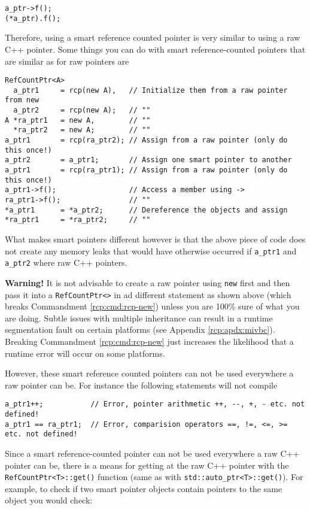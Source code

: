 {\scriptsize\begin{verbatim}
a_ptr->f();
(*a_ptr).f();
\end{verbatim}}

Therefore, using a smart reference counted pointer is very similar to
using a raw C++ pointer.  Some things you can do with smart
reference-counted pointers that are similar as for raw pointers are

{\scriptsize\begin{verbatim}
RefCountPtr<A>
  a_ptr1     = rcp(new A),   // Initialize them from a raw pointer from new
  a_ptr2     = rcp(new A);   // ""
A *ra_ptr1   = new A,        // ""
  *ra_ptr2   = new A;        // ""
a_ptr1       = rcp(ra_ptr2); // Assign from a raw pointer (only do this once!)
a_ptr2       = a_ptr1;       // Assign one smart pointer to another
a_ptr1       = rcp(ra_ptr1); // Assign from a raw pointer (only do this once!)
a_ptr1->f();                 // Access a member using ->
ra_ptr1->f();                // ""
*a_ptr1      = *a_ptr2;      // Dereference the objects and assign
*ra_ptr1     = *ra_ptr2;     // "" 
\end{verbatim}}

What makes smart pointers different however is that the above piece of code
does not create any memory leaks that would have otherwise occurred
if \texttt{a\_ptr1} and \texttt{a\_ptr2} where raw C++ pointers.

\textbf{Warning!} It is not advisable to create a raw pointer using
\texttt{new} first and then pass it into a \texttt{RefCountPtr<>} in
ad different statement as shown above (which breaks Commandment
\ref{rcp:cmd:rcp-new}) unless you are 100\% sure of what you are
doing.  Subtle issues with multiple inheritance can result in a
runtime segmentation fault on certain platforms (see Appendix
\ref{rcp:apdx:mivbc}).  Breaking Commandment \ref{rcp:cmd:rcp-new}
just increases the likelihood that a runtime error will occur on some
platforms.

However, these smart reference counted pointers can not be used
everywhere a raw pointer can be.  For instance the following
statements will not compile

{\scriptsize\begin{verbatim}
a_ptr1++;           // Error, pointer arithmetic ++, --, +, - etc. not defined!
a_ptr1 == ra_ptr1;  // Error, comparision operators ==, !=, <=, >= etc. not defined!
\end{verbatim}}

Since a smart reference-counted pointer can not be used everywhere a
raw C++ pointer can be, there is a means for getting at the raw C++
pointer with the \texttt{RefCountPtr<T>::get()} function (same as with
\texttt{std::auto\_ptr<T>::get()}).  For example, to check if two smart pointer
objects contain pointers to the same object you would check:

